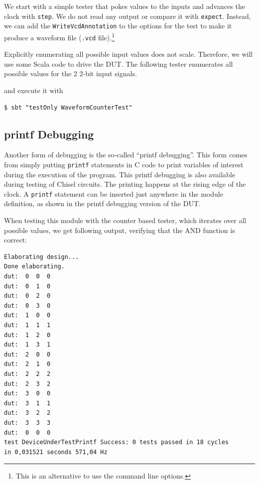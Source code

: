 \documentclass[%
    10pt,
    headinclude, footexclude,
    openright, %
    notitlepage,
    cleardoubleempty,
    headsepline,
    pointlessnumbers,
    bibtotoc, idxtotoc,
    ]{scrbook}
\newcommand{\code}[1]{{\small{\texttt{#1}}}}
\begin{document}

We start with a simple tester that pokes values to the inputs and advances
the clock with \code{step}. We do not read any output or compare it with \code{expect}.
Instead, we can add the \code{WriteVcdAnnotation} to the options for the 
test to make it produce a waveform file (\code{.vcd} file).\footnote{This is an alternative to
use the command line options.}






Explicitly enumerating all possible input values does not scale. Therefore, we will use
some Scala code to drive the DUT. The following tester enumerates all possible values for
the 2 2-bit input signals.


\noindent and execute it with

\begin{verbatim}
$ sbt "testOnly WaveformCounterTest"
\end{verbatim}

\subsection{printf Debugging}

Another form of debugging is the so-called ``printf debugging''. This form comes from
simply putting \code{printf} statements in C code to print variables of interest during
the execution of the program. This printf debugging is also available during testing
of Chisel circuits. The printing happens at the rising edge of the clock.
A \code{printf} statement can be inserted just anywhere in the module definition,
as shown in the printf debugging version of the DUT.


\noindent When testing this module with the counter based tester, which iterates over all possible
values, we get following output, verifying that the AND function is correct:

\begin{verbatim}
Elaborating design...
Done elaborating.
dut:  0  0  0
dut:  0  1  0
dut:  0  2  0
dut:  0  3  0
dut:  1  0  0
dut:  1  1  1
dut:  1  2  0
dut:  1  3  1
dut:  2  0  0
dut:  2  1  0
dut:  2  2  2
dut:  2  3  2
dut:  3  0  0
dut:  3  1  1
dut:  3  2  2
dut:  3  3  3
dut:  0  0  0
test DeviceUnderTestPrintf Success: 0 tests passed in 18 cycles 
in 0,031521 seconds 571,04 Hz
\end{verbatim}
\end{document}
